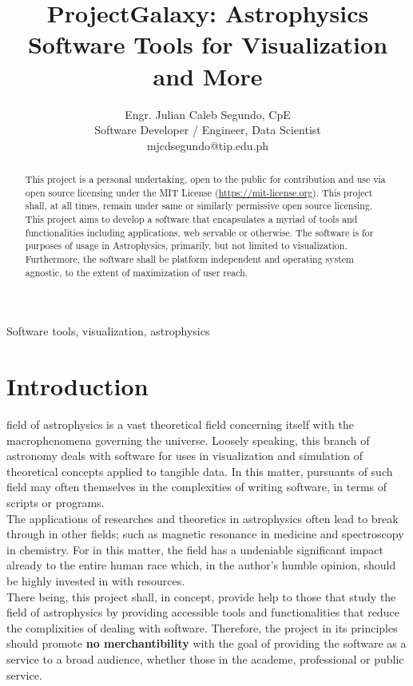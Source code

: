 \documentclass[lettersize,journal]{IEEEtran}
\begin{document}
\title{ProjectGalaxy: Astrophysics Software Tools for Visualization and More}
\author{
    Engr. Julian Caleb Segundo, CpE \\
    Software Developer / Engineer, Data Scientist \\
    mjcdsegundo@tip.edu.ph  
}
\maketitle

\begin{abstract}
This project is a personal undertaking, open to the public for contribution and use via open source licensing under the MIT License (\url{https://mit-license.org}). This project shall, at all times, remain under same or similarly permissive open source licensing.  This project aims to develop a software that encapsulates a myriad of tools and functionalities including applications, web servable or otherwise. The software is for purposes of usage in Astrophysics, primarily, but not limited to visualization. Furthermore, the software shall be platform independent and operating system agnostic, to the extent of maximization of user reach.
\end{abstract}
\begin{IEEEkeywords}
Software tools, visualization, astrophysics
\end{IEEEkeywords}

\section{Introduction}
 field of astrophysics is a vast theoretical field concerning itself with the macrophenomena governing the universe\cite{ref1}. Loosely speaking, this branch of astronomy deals with software for uses in visualization and simulation of theoretical concepts applied to tangible data. In this matter, pursuants of such field may often themselves in the complexities of writing software, in terms of scripts or programs. \\
The applications of researches and theoretics in astrophysics often lead to break through in other fields; such as magnetic resonance in medicine and spectroscopy in chemistry. For in this matter, the field has a undeniable significant impact already to the entire human race which, in the author's humble opinion, should be highly invested in with resources. \\
There being, this project shall, in concept, provide help to those that study the field of astrophysics by providing accessible tools and functionalities that reduce the complixities of dealing with software. Therefore, the project in its principles should promote {\bf{no merchantibility}} with the goal of providing the software as a service to a broad audience, whether those in the academe, professional or public service. 
\end{document}
